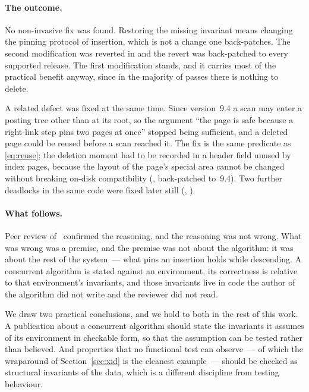 \paragraph{The outcome.} No non-invasive fix was found. Restoring the missing
invariant means changing the pinning protocol of insertion, which is not a
change one back-patches. The second modification was reverted in
 and the revert was back-patched to every supported release.
The first modification stands, and it carries most of the practical benefit
anyway, since in the majority of passes there is nothing to delete.

A related defect was fixed at the same time. Since version~9.4 a scan may enter
a posting tree other than at its root, so the argument ``the page is safe
because a right-link step pins two pages at once'' stopped being sufficient, and
a deleted page could be reused before a scan reached it. The fix is the same
predicate as \eqref{eq:reuse}; the deletion moment had to be recorded in a
header field unused by index pages, because the layout of the page's special
area cannot be changed without breaking on-disk compatibility
(, back-patched to~9.4). Two further deadlocks in the same
code were fixed later still (, ).

\paragraph{What follows.} Peer review of~\cite{borodin2018gin} confirmed the
reasoning, and the reasoning was not wrong. What was wrong was a premise, and
the premise was not about the algorithm: it was about the rest of the system~---
what pins an insertion holds while descending. A concurrent algorithm is stated
against an environment, its correctness is relative to that environment's
invariants, and those invariants live in code the author of the algorithm did
not write and the reviewer did not read.

We draw two practical conclusions, and we hold to both in the rest of this work.
A publication about a concurrent algorithm should state the invariants it
assumes of its environment in checkable form, so that the assumption can be
tested rather than believed. And properties that no functional test can
observe~--- of which the wraparound of Section~\ref{sec:xid} is the cleanest
example~--- should be checked as structural invariants of the data, which is a
different discipline from testing behaviour.

